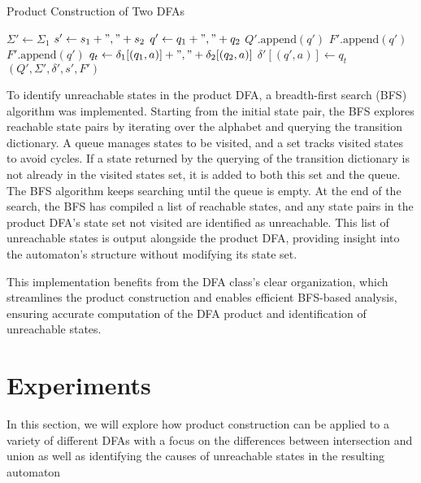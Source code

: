 \documentclass[conference]{IEEEtran}
\begin{document}
\begin{algorithm}
\caption{Product Construction of Two DFAs}
\label{alg:product}
\begin{algorithmic}
\State $\Sigma' \gets \Sigma_1$
\State $s' \gets s_1 + "," + s_2$
        \State $q' \gets q_1 + "," + q_2$
        \State $Q'.\text{append}(q')$
                \State $F'.\text{append}(q')$
            \EndIf
        \EndIf
                \State $F'.\text{append}(q')$
            \EndIf
        \EndIf
            \State $q_t \gets \delta_1[(q_1, a)] + "," + \delta_2[(q_2, a)]$
            \State $\delta'[(q', a)] \gets q_t$
        \EndFor
    \EndFor
\EndFor
\State \Return {}$(Q', \Sigma', \delta', s', F')$
\end{algorithmic}
\end{algorithm}

To identify unreachable states in the product DFA, a breadth-first search (BFS) algorithm was implemented. Starting from the initial state pair, the BFS explores reachable state pairs by iterating over the alphabet and querying the transition dictionary. A queue manages states to be visited, and a set tracks visited states to avoid cycles. If a state returned by the querying of the transition dictionary is not already in the visited states set, it is added to both this set and the queue. The BFS algorithm keeps searching until the queue is empty. At the end of the search, the BFS has compiled a list of reachable states, and any state pairs in the product DFA's state set not visited are identified as unreachable. This list of unreachable states is output alongside the product DFA, providing insight into the automaton's structure without modifying its state set.

This implementation benefits from the DFA class's clear organization, which streamlines the product construction and enables efficient BFS-based analysis, ensuring accurate computation of the DFA product and identification of unreachable states.

\section{Experiments}
In this section, we will explore how product construction can be applied to a variety of different DFAs with a focus on the differences between intersection and union as well as identifying the causes of unreachable states in the resulting automaton
\end{document}
